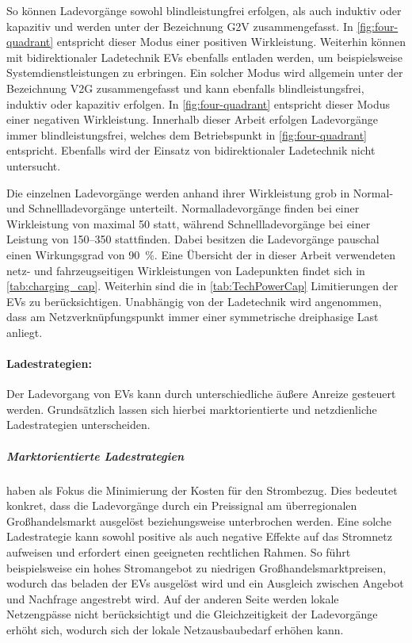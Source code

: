 

So können Ladevorgänge sowohl blindleistungfrei erfolgen, als auch induktiv oder kapazitiv und werden unter der Bezeichnung \gls{G2V} zusammengefasst.
In \autoref{fig:four-quadrant} entspricht dieser Modus einer positiven Wirkleistung.
Weiterhin können mit bidirektionaler Ladetechnik \glspl{EV} ebenfalls entladen werden, um beispielsweise Systemdienstleistungen zu erbringen.
Ein solcher Modus wird allgemein unter der Bezeichnung \gls{V2G} zusammengefasst und kann ebenfalls blindleistungsfrei, induktiv oder kapazitiv erfolgen.
In \autoref{fig:four-quadrant} entspricht dieser Modus einer negativen Wirkleistung. \cite{He2020} 
Innerhalb dieser Arbeit erfolgen Ladevorgänge immer blindleistungsfrei, welches dem Betriebspunkt in \autoref{fig:four-quadrant} entspricht.
Ebenfalls wird der Einsatz von bidirektionaler Ladetechnik nicht untersucht.\medskip

Die einzelnen Ladevorgänge werden anhand ihrer Wirkleistung grob in Normal- und Schnellladevorgänge unterteilt.
Normalladevorgänge finden bei einer Wirkleistung von maximal \SI{50}{\kw} statt, während Schnellladevorgänge bei einer Leistung von \SIrange[range-phrase=~{oder}~]{150}{350}{\kw} stattfinden.
Dabei besitzen die Ladevorgänge pauschal einen Wirkungsgrad von \SI{90}{\percent}.
Eine Übersicht der in dieser Arbeit verwendeten netz- und fahrzeugseitigen Wirkleistungen von Ladepunkten findet sich in \autoref{tab:charging_cap}.
Weiterhin sind die in \autoref{tab:TechPowerCap} Limitierungen der \glspl{EV} zu berücksichtigen.
Unabhängig von der Ladetechnik wird angenommen, dass am Netzverknüpfungspunkt immer einer symmetrische dreiphasige Last anliegt.




\paragraph{Ladestrategien:}

Der Ladevorgang von \glspl{EV} kann durch unterschiedliche äußere Anreize gesteuert werden. Grundsätzlich lassen sich hierbei marktorientierte und netzdienliche Ladestrategien unterscheiden.


\subparagraph{Marktorientierte Ladestrategien} haben als Fokus die Minimierung der Kosten für den Strombezug. Dies bedeutet konkret, dass die Ladevorgänge durch ein Preissignal am überregionalen Großhandelsmarkt ausgelöst beziehungsweise unterbrochen werden. Eine solche Ladestrategie kann sowohl positive als auch negative Effekte auf das Stromnetz aufweisen und erfordert einen geeigneten rechtlichen Rahmen. So führt beispielsweise ein hohes Stromangebot zu niedrigen Großhandelsmarktpreisen, wodurch das beladen der \glspl{EV} ausgelöst wird und ein Ausgleich zwischen Angebot und Nachfrage angestrebt wird. Auf der anderen Seite werden lokale Netzengpässe nicht berücksichtigt und die Gleichzeitigkeit der Ladevorgänge erhöht sich, wodurch sich der lokale Netzausbaubedarf erhöhen kann. \cite{Agora2019} \cite{Dorendorf2019} \cite{Rehtanz2017}


